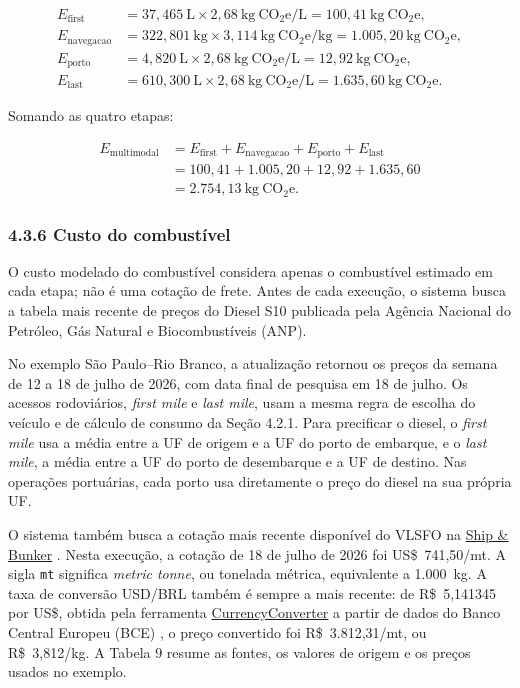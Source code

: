 \documentclass[brazil,]{article}
\let\oldsubsubsection\subsubsection
\renewcommand{\subsubsection}{\Needspace{10\baselineskip}\oldsubsubsection}
\begin{document}
\[
\begin{aligned}
E_{\mathrm{first}}
&=37{,}465\ \mathrm{L}\times2{,}68\ \mathrm{kg\ CO_2e/L}
=100{,}41\ \mathrm{kg\ CO_2e},\\
E_{\mathrm{navegacao}}
&=322{,}801\ \mathrm{kg}\times3{,}114\ \mathrm{kg\ CO_2e/kg}
=1.005{,}20\ \mathrm{kg\ CO_2e},\\
E_{\mathrm{porto}}
&=4{,}820\ \mathrm{L}\times2{,}68\ \mathrm{kg\ CO_2e/L}
=12{,}92\ \mathrm{kg\ CO_2e},\\
E_{\mathrm{last}}
&=610{,}300\ \mathrm{L}\times2{,}68\ \mathrm{kg\ CO_2e/L}
=1.635{,}60\ \mathrm{kg\ CO_2e}.
\end{aligned}
\]

Somando as quatro etapas:

\[
\begin{aligned}
E_{\mathrm{multimodal}}
&=E_{\mathrm{first}}+E_{\mathrm{navegacao}}
+E_{\mathrm{porto}}+E_{\mathrm{last}}\\
&=100{,}41+1.005{,}20+12{,}92+1.635{,}60\\
&=2.754{,}13\ \mathrm{kg\ CO_2e}.
\end{aligned}
\]

\hypertarget{custo-do-combustuxedvel}{%
\subsubsection{4.3.6 Custo do
combustível}\label{custo-do-combustuxedvel}}

O custo modelado do combustível considera apenas o combustível estimado
em cada etapa; não é uma cotação de frete. Antes de cada execução, o
sistema busca a tabela mais recente de preços do Diesel S10 publicada
pela Agência Nacional do Petróleo, Gás Natural e Biocombustíveis (ANP).

No exemplo São Paulo--Rio Branco, a atualização retornou os preços da
semana de 12 a 18 de julho de 2026, com data final de pesquisa em 18 de
julho. Os acessos rodoviários, \emph{first mile} e \emph{last mile},
usam a mesma regra de escolha do veículo e de cálculo de consumo da
Seção 4.2.1. Para precificar o diesel, o \emph{first mile} usa a média
entre a UF de origem e a UF do porto de embarque, e o \emph{last mile},
a média entre a UF do porto de desembarque e a UF de destino. Nas
operações portuárias, cada porto usa diretamente o preço do diesel na
sua própria UF.

O sistema também busca a cotação mais recente disponível do VLSFO na
\href{https://shipandbunker.com/prices/br-brazil}{Ship \& Bunker}
\parencite{shipbunker2026}. Nesta
execução, a cotação de 18 de julho de 2026 foi US\$~741,50/mt. A sigla
\texttt{mt} significa \emph{metric tonne}, ou tonelada métrica,
equivalente a 1.000~kg. A taxa de conversão USD/BRL também é sempre a
mais recente: de R\$~5,141345 por US\$, obtida pela ferramenta
\href{https://pypi.org/project/CurrencyConverter/}{CurrencyConverter} a
partir de dados do Banco Central Europeu (BCE) \parencite{ecb2026}, o preço convertido foi
R\$~3.812,31/mt, ou R\$~3,812/kg. A Tabela 9 resume as fontes, os
valores de origem e os preços usados no exemplo.
\end{document}
